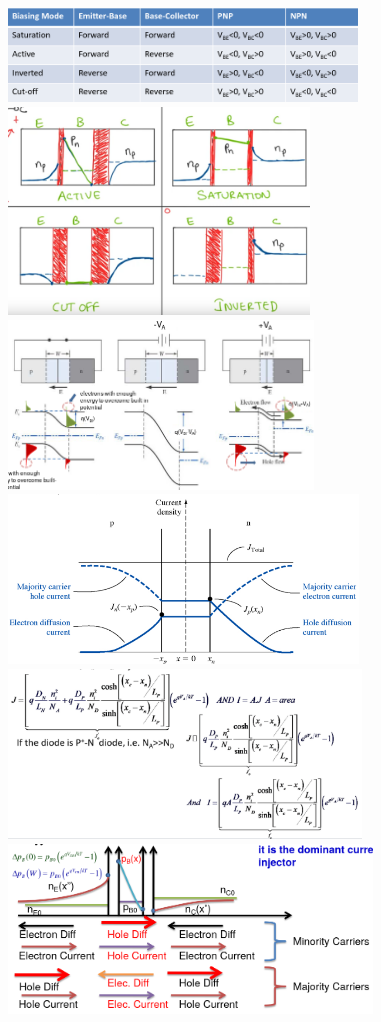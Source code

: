 \documentclass{article}
\begin{document}
\begin{center}
    \includegraphics[align=c, height=2.5cm]{bjtvolts.png}
    \includegraphics[align=c, height=5.5cm]{pnpcarriers.png}
    \includegraphics[align=c, height=4.5cm]{pnbias.png}
    \includegraphics[align=c, height=4.5cm]{pncurrent.png}
    \includegraphics[align=c, height=4.5cm]{narrowcurrent.png}
    \includegraphics[align=c, height=4.5cm]{pnpfwdcarriers.png}

\end{center}
\end{document}
